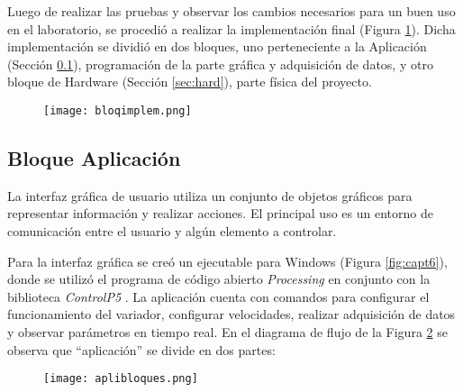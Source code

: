Luego de realizar las pruebas y observar los cambios necesarios para un buen uso en el laboratorio, se procedió a realizar la implementación final (Figura \ref{fig:implebloq}). Dicha implementación se dividió en dos bloques, uno perteneciente a la Aplicación (Sección \ref{sec:aplic}), programación de la parte gráfica y adquisición de datos, y otro bloque de Hardware (Sección \ref{sec:hard}), parte física del proyecto. 


\begin{figure}[h!]
	\centering
	\texttt{[image: bloqimplem.png]}
	\label{fig:implebloq}
\end{figure}





\subsection{Bloque Aplicación} 	\label{sec:aplic}
\begin{tcolorbox}[colback=blue!5!white,colframe=blue!75!black,title=GUI]
	La interfaz gráfica de usuario utiliza un conjunto de objetos gráficos para representar información y realizar acciones. El principal uso es un entorno de comunicación entre el usuario y algún elemento a controlar.
\end{tcolorbox}

Para la interfaz gráfica se creó un ejecutable para Windows (Figura \ref{fig:capt6}), donde se utilizó el programa de código abierto \textit{Processing} en conjunto con la biblioteca \textit{ControlP5} \cite{controlp5}. La aplicación cuenta con comandos para configurar el funcionamiento del variador, configurar velocidades, realizar adquisición de datos y observar parámetros en tiempo real.
En el diagrama de flujo de la Figura \ref{fig:bloqvis} se observa que “aplicación” se divide en dos partes: 

\begin{figure}[H]
	\centering
	\texttt{[image: aplibloques.png]}
	\label{fig:bloqvis}
\end{figure}

